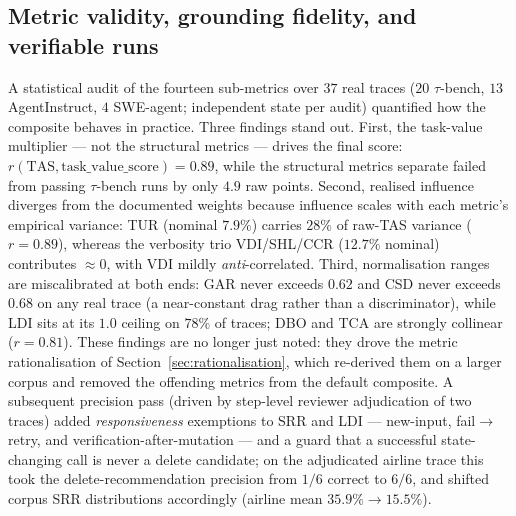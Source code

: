 \documentclass[11pt]{article}
\begin{document}
\subsection{Metric validity, grounding fidelity, and verifiable runs}
\label{sec:metric-eval}
A statistical audit of the fourteen sub-metrics over $37$ real traces
($20$ $\tau$-bench, $13$ AgentInstruct, $4$ SWE-agent; independent state per
audit) quantified how the composite behaves in practice. Three findings stand
out. First, the task-value multiplier --- not the structural metrics --- drives
the final score: $r(\mathrm{TAS},\allowbreak \mathrm{task\_value\_score})=0.89$,
while the structural metrics separate failed from passing $\tau$-bench runs by
only $4.9$ raw points. Second, realised influence diverges from the documented
weights because influence scales with each metric's empirical variance:
TUR (nominal $7.9\%$) carries $28\%$ of raw-TAS variance ($r=0.89$), whereas
the verbosity trio VDI/SHL/CCR ($12.7\%$ nominal) contributes $\approx 0$, with
VDI mildly \emph{anti}-correlated. Third, normalisation ranges are
miscalibrated at both ends: GAR never exceeds $0.62$ and CSD never exceeds
$0.68$ on any real trace (a near-constant drag rather than a discriminator),
while LDI sits at its $1.0$ ceiling on $78\%$ of traces; DBO and TCA are
strongly collinear ($r=0.81$). These findings are no longer just noted: they
drove the metric rationalisation of Section~\ref{sec:rationalisation}, which
re-derived them on a larger corpus and removed the offending metrics from the
default composite. A subsequent precision pass (driven by
step-level reviewer adjudication of two traces) added \emph{responsiveness}
exemptions to SRR and LDI --- new-input, fail$\to$retry, and
verification-after-mutation --- and a guard that a successful state-changing
call is never a delete candidate; on the adjudicated airline trace this took
the delete-recommendation precision from $1/6$ correct to $6/6$, and shifted
corpus SRR distributions accordingly (airline mean $35.9\%\to15.5\%$).
\end{document}
